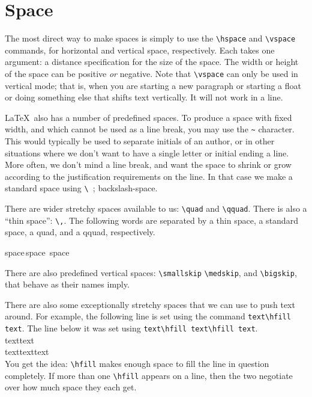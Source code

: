 \documentclass[UTF8]{article}
\begin{document}
	\section{Space}
	The most direct way to make spaces is simply to use the
	\verb(\hspace( and \verb(\vspace( commands, for horizontal
	and vertical space, respectively.  Each takes one
	argument: a distance specification for the size of the space.
	The width or height of the space can be positive {\em or}
	negative.  Note that \verb(\vspace( can only be used in 
	vertical mode; that is, when you are starting a new paragraph
	or starting a float or doing something else that shifts text
	vertically.  It will not work in a line.
	
	\LaTeX\ also has a number of predefined spaces.  To produce a
	space with fixed width, and which cannot be used as a line break,
	you may use the \verb(~( character.  This would typically be used
	to separate initials of an author, or in other situations where
	we don't want to have a single letter or initial ending a line.
	More often, we don't mind a line break, and want the space to shrink
	or grow according to the justification requirements on the line.
	In that case we make a standard space using \verb(\ (; backslash-space.
	
	There are wider stretchy spaces available to us: \verb(\quad( and 
	\verb(\qquad(.  There is also a ``thin space'': \verb(\,(.
	The following words are separated by a thin space, a standard space,
	a quad, and a qquad, respectively.
	
	\begin{center}
		space\,space\ space
	\end{center}
	
	There are also predefined vertical spaces: \verb(\smallskip(
	\verb(\medskip(, and \verb(\bigskip(, that behave as their
	names imply.
	
	There are also some exceptionally stretchy spaces that we can 
	use to push text around.  For example, the following line is 
	set using the command \verb(text\hfill text(.  The line below it 
	was set using \verb(text\hfill text\hfill text(.\\
	{text\hfill text}\\
	text\hfill text\hfill text\\
	You get the idea: \verb(\hfill( makes enough space to fill the line
	in question completely.  If more than one \verb(\hfill( appears
	on a line, then the two negotiate over how much space they each get.
	
\end{document}
